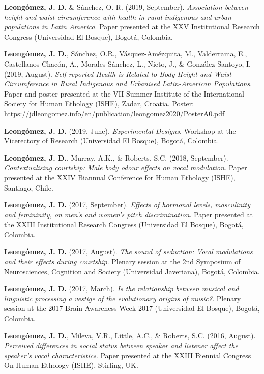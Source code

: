 \documentclass[11pt, a4paper]{awesome-cv}
\begin{document}
\textbf{Leongómez, J. D.} \& Sánchez, O. R. (2019, September).
\emph{Association between height and waist circumference with health in
rural indigenous and urban populations in Latin America}. Paper
presented at the XXV Institutional Research Congress (Universidad El
Bosque), Bogotá, Colombia.

\textbf{Leongómez, J. D.}, Sánchez, O.R., Vásquez-Amézquita, M.,
Valderrama, E., Castellanos-Chacón, A., Morales-Sánchez, L., Nieto, J.,
\& González-Santoyo, I. (2019, August). \emph{Self-reported Health is
Related to Body Height and Waist Circumference in Rural Indigenous and
Urbanised Latin-American Populations}. Paper and poster presented at the
VII Summer Institute of the International Society for Human Ethology
(ISHE), Zadar, Croatia. Poster:
\url{https://jdleongomez.info/en/publication/leongomez2020/PosterA0.pdf}

\textbf{Leongómez, J. D.} (2019, June). \emph{Experimental Designs}.
Workshop at the Vicerectory of Research (Universidad El Bosque), Bogotá,
Colombia.

\textbf{Leongómez, J. D.}, Murray, A.K., \& Roberts, S.C. (2018,
September). \emph{Contextualising courtship: Male body odour effects on
vocal modulation}. Paper presented at the XXIV Biannual Conference for
Human Ethology (ISHE), Santiago, Chile.

\textbf{Leongómez, J. D.} (2017, September). \emph{Effects of hormonal
levels, masculinity and femininity, on men's and women's pitch
discrimination}. Paper presented at the XXIII Institutional Research
Congress (Universidad El Bosque), Bogotá, Colombia.

\textbf{Leongómez, J. D.} (2017, August). \emph{The sound of seduction:
Vocal modulations and their effects during courtship}. Plenary session
at the 2nd Symposium of Neurosciences, Cognition and Society
(Universidad Javeriana), Bogotá, Colombia.

\textbf{Leongómez, J. D.} (2017, March). \emph{Is the relationship
between musical and linguistic processing a vestige of the evolutionary
origins of music?}. Plenary session at the 2017 Brain Awareness Week
2017 (Universidad El Bosque), Bogotá, Colombia.

\textbf{Leongómez, J. D.}, Mileva, V.R., Little, A.C., \& Roberts, S.C.
(2016, August). \emph{Perceived differences in social status between
speaker and listener affect the speaker's vocal characteristics}. Paper
presented at the XXIII Biennial Congress On Human Ethology (ISHE),
Stirling, UK.
\end{document}
